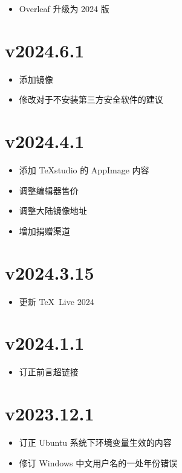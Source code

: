 \begin{itemize}
  \item Overleaf 升级为 2024 版
\end{itemize}

\section*{v2024.6.1}

\begin{itemize}
  \item 添加镜像
  \item 修改对于不安装第三方安全软件的建议
\end{itemize}

\section*{v2024.4.1}

\begin{itemize}
  \item 添加 \TeX studio 的 AppImage 内容
  \item 调整编辑器售价
  \item 调整大陆镜像地址
  \item 增加捐赠渠道
\end{itemize}

\section*{v2024.3.15}

\begin{itemize}
  \item 更新 \TeX\ Live 2024
\end{itemize}

\section*{v2024.1.1}

\begin{itemize}
  \item 订正前言超链接
\end{itemize}

\section*{v2023.12.1}

\begin{itemize}
  \item 订正 Ubuntu 系统下环境变量生效的内容
  \item 修订 Windows 中文用户名的一处年份错误
\end{itemize}

